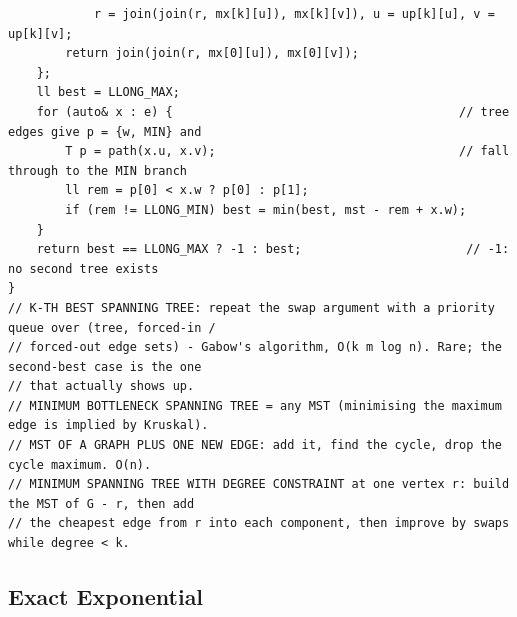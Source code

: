 \documentclass[9pt,a4paper,twocolumn]{extarticle}
\begin{document}
\begin{lstlisting}
            r = join(join(r, mx[k][u]), mx[k][v]), u = up[k][u], v = up[k][v];
        return join(join(r, mx[0][u]), mx[0][v]);
    };
    ll best = LLONG_MAX;
    for (auto& x : e) {                                        // tree edges give p = {w, MIN} and
        T p = path(x.u, x.v);                                  // fall through to the MIN branch
        ll rem = p[0] < x.w ? p[0] : p[1];
        if (rem != LLONG_MIN) best = min(best, mst - rem + x.w);
    }
    return best == LLONG_MAX ? -1 : best;                       // -1: no second tree exists
}
// K-TH BEST SPANNING TREE: repeat the swap argument with a priority queue over (tree, forced-in /
// forced-out edge sets) - Gabow's algorithm, O(k m log n). Rare; the second-best case is the one
// that actually shows up.
// MINIMUM BOTTLENECK SPANNING TREE = any MST (minimising the maximum edge is implied by Kruskal).
// MST OF A GRAPH PLUS ONE NEW EDGE: add it, find the cycle, drop the cycle maximum. O(n).
// MINIMUM SPANNING TREE WITH DEGREE CONSTRAINT at one vertex r: build the MST of G - r, then add
// the cheapest edge from r into each component, then improve by swaps while degree < k.
\end{lstlisting}

\subsection{Exact Exponential}

\filbreak
\end{document}
